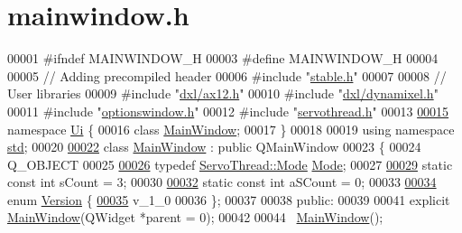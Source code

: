 \hypertarget{a00018_source}{}\section{mainwindow.\+h}

\begin{DoxyCode}
00001 \textcolor{preprocessor}{#ifndef MAINWINDOW\_H}
00003 \textcolor{preprocessor}{#define MAINWINDOW\_H}
00004 
00005 \textcolor{comment}{// Adding precompiled header}
00006 \textcolor{preprocessor}{#include "\hyperlink{a00025}{stable.h}"}
00007 
00008 \textcolor{comment}{// User libraries}
00009 \textcolor{preprocessor}{#include "\hyperlink{a00011}{dxl/ax12.h}"}
00010 \textcolor{preprocessor}{#include "\hyperlink{a00015}{dxl/dynamixel.h}"}
00011 \textcolor{preprocessor}{#include "\hyperlink{a00020}{optionswindow.h}"}
00012 \textcolor{preprocessor}{#include "\hyperlink{a00024}{servothread.h}"}
00013 
\hypertarget{a00018_source_l00015}{}\hyperlink{a00027}{00015} \textcolor{keyword}{namespace }\hyperlink{a00027}{Ui} \{
00016 \textcolor{keyword}{class }\hyperlink{a00005}{MainWindow};
00017 \}
00018 
00019 \textcolor{keyword}{using namespace }\hyperlink{a00026}{std};
00020 
\hypertarget{a00018_source_l00022}{}\hyperlink{a00005}{00022} \textcolor{keyword}{class }\hyperlink{a00005}{MainWindow} : \textcolor{keyword}{public} QMainWindow
00023 \{
00024     Q\_OBJECT
00025     
\hypertarget{a00018_source_l00026}{}\hyperlink{a00005_a372482d77430e41c5483ab8605eece9d}{00026}     \textcolor{keyword}{typedef} \hyperlink{a00009_a8d581034e60792a9995d44065f6140a5}{ServoThread::Mode} \hyperlink{a00005_a372482d77430e41c5483ab8605eece9d}{Mode};
00027     
\hypertarget{a00018_source_l00029}{}\hyperlink{a00005_a646727b1c45c72638325adfd460649c0}{00029}     \textcolor{keyword}{static} \textcolor{keyword}{const} \textcolor{keywordtype}{int} sCount = 3;
00030     
\hypertarget{a00018_source_l00032}{}\hyperlink{a00005_a42c44af9c0eebc33f4e81f02e15b0461}{00032}     \textcolor{keyword}{static} \textcolor{keyword}{const} \textcolor{keywordtype}{int} aSCount = 0;
00033     
\hypertarget{a00018_source_l00034}{}\hyperlink{a00005_a355d9f17965e5105226409313743cb9d}{00034}     \textcolor{keyword}{enum} \hyperlink{a00005_a355d9f17965e5105226409313743cb9d}{Version} \{
\hypertarget{a00018_source_l00035}{}\hyperlink{a00005_a355d9f17965e5105226409313743cb9daac0c8ddcec40274ec60fb95f59ba7aba}{00035}         v\_1\_0
00036     \};
00037     
00038 \textcolor{keyword}{public}:
00039     
00041     \textcolor{keyword}{explicit} \hyperlink{a00005}{MainWindow}(QWidget *parent = 0);
00042     
00044     ~\hyperlink{a00005}{MainWindow}();

\end{DoxyCode}
